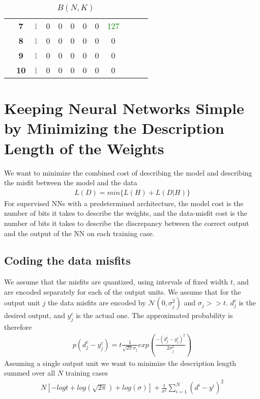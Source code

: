 \documentclass[../../main.tex]{subfiles}
\numberwithin{equation}{section}
\begin{document}
\begin{table}[ht]
\begin{tabular}{c|c||*{10}{c|}}
    \cline{2-9}
&    \bfseries 7  & \textcolor{gray}{1}   & 0   & 0   & 0   & 0   & 0    & \textcolor{green}{127}\\

    \cline{2-9}
&    \bfseries 8  & \textcolor{gray}{1}   & 0   & 0   & 0   & 0   & 0   & 0\\

    \cline{2-9}
&    \bfseries 9  & \textcolor{gray}{1}   & 0   & 0   & 0   & 0   & 0   & 0\\

    \cline{2-9}
&    \bfseries 10 & \textcolor{gray}{1}   & 0   & 0   & 0   & 0   & 0   & 0\\

    \cline{2-9}
  \end{tabular}
  \caption{$B(N, K)$}
\end{table} 




\section{Keeping Neural Networks Simple by Minimizing
the Description Length of the Weights}
We want to minimize the combined cost of describing the model and describing the misfit between the model and the data
\begin{align}
    L(D)=min\{ L(H) + L(D|H) \}
\end{align}
For supervised NNs with a predetermined architecture, the model cost is the number of bits it takes to describe the weights, and the data-misfit cost is the number of bits it takes to describe the discrepancy between the correct output and the output of the NN on each training case.
\subsection{Coding the data misfits}
We assume that the misfits are quantized, using intervals of fixed width $t$, and are encoded separately for each of the output units. We assume that for the output unit $j$ the data misfits are encoded by $\mathcal{N}(0, \sigma_j^2)$ and $\sigma_j>>t$. $d_j^c$ is the desired output, and $y_j^c$ is the actual one. The approximated probability is therefore
\begin{align}
    p(d_j^c-y_j^c)=t\frac{1}{\sqrt{2\pi}\sigma_j}exp(\frac{-(d_j^c-y_j^c)^2}{2\sigma_j^2})
\end{align}
 Assuming a single output unit we want to minimize the description length summed over all $N$ training cases
\begin{align}
    N[-logt + log(\sqrt{2\pi}) + log(\sigma)]+\frac{1}{\sigma^2}\sum\limits_{i=1}^N (d^i-y^i)^2
\end{align}\label{eqn:misfits-raw-bit}
\end{document}
